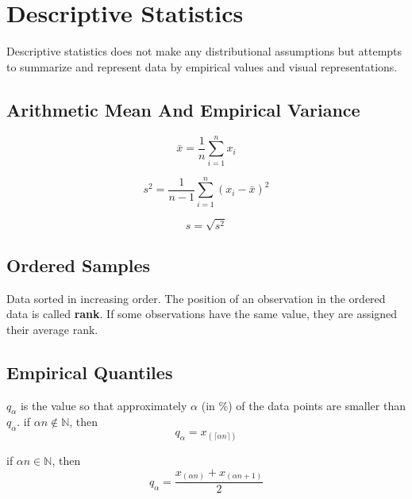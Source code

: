 \section{Descriptive Statistics}
Descriptive statistics does not make any distributional assumptions but attempts to summarize and represent data by empirical values and visual representations.
\subsection{Arithmetic Mean And Empirical Variance}

\begin{equation*}
    \bar{x}=\frac{1}{n}\sum_{i=1}^{n}x_i
\end{equation*}

\newpar{}

\begin{equation*}
    s^2=\frac{1}{n-1}\sum_{i=1}^{n}{(x_i-\bar{x})}^2
\end{equation*}

\newpar{}

\begin{equation*}
    s=\sqrt{s^2}
\end{equation*}

\subsection{Ordered Samples}

Data sorted in increasing order. The position of an observation in the ordered data is called \textbf{rank}. If some observations have the same value, they are assigned their average rank.

\subsection{Empirical Quantiles}
$q_\alpha$ is the value so that approximately $\alpha$ (in $\%$) of the data points are smaller than $q_\alpha$.
\newpar{}
if $\alpha n \notin \mathbb{N}$, then
\begin{equation*}
    q_\alpha = x_{(\lceil\alpha n\rceil)}
\end{equation*}

if $\alpha n \in \mathbb{N}$, then
\begin{equation*}
    q_\alpha = \frac{x_{(\alpha n)}+x_{(\alpha n+1)}}{2}
\end{equation*}

